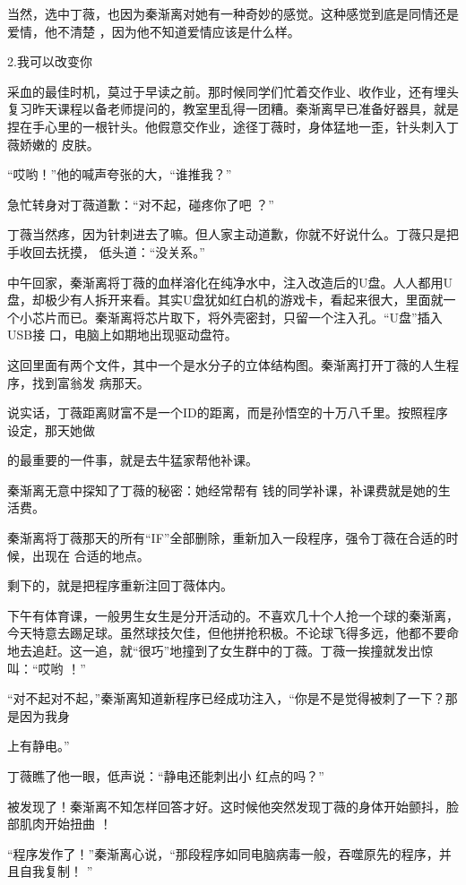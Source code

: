 \documentclass{article}
\begin{document}
当然，选中丁薇，也因为秦渐离对她有一种奇妙的感觉。这种感觉到底是同情还是爱情，他不清楚
，因为他不知道爱情应该是什么样。 


2.我可以改变你 

采血的最佳时机，莫过于早读之前。那时候同学们忙着交作业、收作业，还有埋头复习昨天课程以备老师提问的，教室里乱得一团糟。秦渐离早已准备好器具，就是捏在手心里的一根针头。他假意交作业，途径丁薇时，身体猛地一歪，针头刺入丁薇娇嫩的
皮肤。 

“哎哟！”他的喊声夸张的大，“谁推我？”

\newpage
 

急忙转身对丁薇道歉：“对不起，碰疼你了吧
？” 

丁薇当然疼，因为针刺进去了嘛。但人家主动道歉，你就不好说什么。丁薇只是把手收回去抚摸，
低头道：“没关系。” 

中午回家，秦渐离将丁薇的血样溶化在纯净水中，注入改造后的U盘。人人都用U盘，却极少有人拆开来看。其实U盘犹如红白机的游戏卡，看起来很大，里面就一个小芯片而已。秦渐离将芯片取下，将外壳密封，只留一个注入孔。“U盘”插入USB接
口，电脑上如期地出现驱动盘符。 

这回里面有两个文件，其中一个是水分子的立体结构图。秦渐离打开丁薇的人生程序，找到富翁发
病那天。 

说实话，丁薇距离财富不是一个ID的距离，而是孙悟空的十万八千里。按照程序设定，那天她做
\newpage

的最重要的一件事，就是去牛猛家帮他补课。 

秦渐离无意中探知了丁薇的秘密：她经常帮有
钱的同学补课，补课费就是她的生活费。 

秦渐离将丁薇那天的所有“IF”全部删除，重新加入一段程序，强令丁薇在合适的时候，出现在
合适的地点。 


剩下的，就是把程序重新注回丁薇体内。 

下午有体育课，一般男生女生是分开活动的。不喜欢几十个人抢一个球的秦渐离，今天特意去踢足球。虽然球技欠佳，但他拼抢积极。不论球飞得多远，他都不要命地去追赶。这一追，就“很巧”地撞到了女生群中的丁薇。丁薇一挨撞就发出惊叫：“哎哟
！” 

“对不起对不起，”秦渐离知道新程序已经成功注入，“你是不是觉得被刺了一下？那是因为我身

\newpage
上有静电。” 

丁薇瞧了他一眼，低声说：“静电还能刺出小
红点的吗？” 

被发现了！秦渐离不知怎样回答才好。这时候他突然发现丁薇的身体开始颤抖，脸部肌肉开始扭曲
！ 

“程序发作了！”秦渐离心说，“那段程序如同电脑病毒一般，吞噬原先的程序，并且自我复制！
” 
\end{document}
